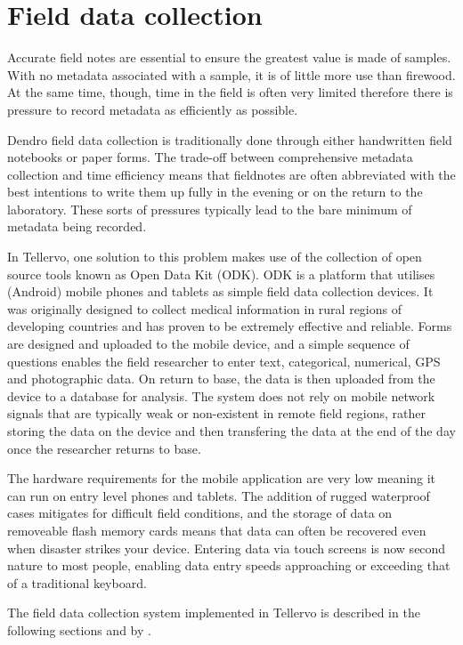 \chapter{Field data collection}
\label{txt:odk}

 Accurate field notes are essential to ensure the greatest value is made of samples.  With no metadata associated with a sample, it is of little more use than firewood.  At the same time, though, time in the field is often very limited therefore there is pressure to record metadata as efficiently as possible.
 
 Dendro field data collection is traditionally done through either handwritten field notebooks or paper forms. The trade-off between comprehensive metadata collection and time efficiency means that fieldnotes are often abbreviated with the best intentions to write them up fully in the evening or on the return to the laboratory.  These sorts of pressures typically lead to the bare minimum of metadata being recorded.
 
 In Tellervo, one solution to this problem makes use of the collection of open source tools known as Open Data Kit (ODK).  ODK is a platform that utilises (Android) mobile phones and tablets as simple field data collection devices.  It was originally designed to collect medical information in rural regions of developing countries and has proven to be extremely effective and reliable.  Forms are designed and uploaded to the mobile device, and a simple sequence of questions enables the field researcher to enter text, categorical, numerical, GPS and photographic data.  On return to base, the data is then uploaded from the device to a database for analysis.  The system does not rely on mobile network signals that are typically weak or non-existent in remote field regions, rather storing the data on the device and then transfering the data at the end of the day once the researcher returns to base.
 
 The hardware requirements for the mobile application are very low meaning it can run on entry level phones and tablets.  The addition of rugged waterproof cases mitigates for difficult field conditions, and the storage of data on removeable flash memory cards means that data can often be recovered even when disaster strikes your device.  Entering data via touch screens is now second nature to most people, enabling data entry speeds approaching or exceeding that of a traditional keyboard.
 
 The field data collection system implemented in Tellervo is described in the following sections and by \citet{brewer2016}.
 
